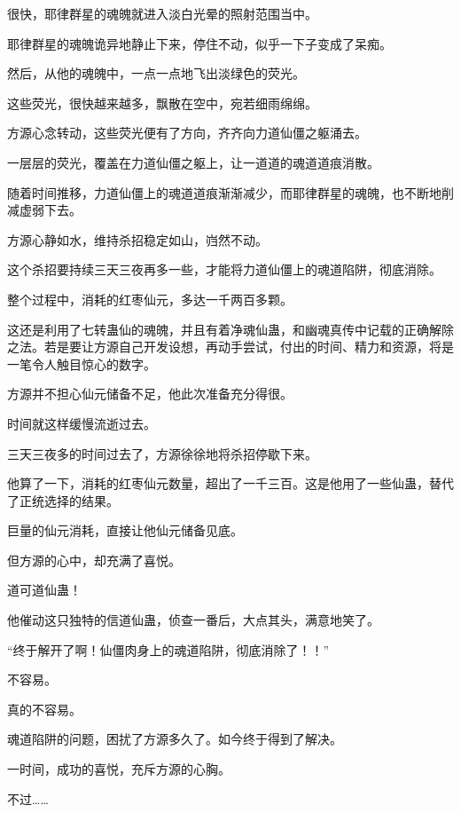 
\begin{this_body}



很快，耶律群星的魂魄就进入淡白光晕的照射范围当中。

耶律群星的魂魄诡异地静止下来，停住不动，似乎一下子变成了呆痴。

然后，从他的魂魄中，一点一点地飞出淡绿色的荧光。

这些荧光，很快越来越多，飘散在空中，宛若细雨绵绵。

方源心念转动，这些荧光便有了方向，齐齐向力道仙僵之躯涌去。

一层层的荧光，覆盖在力道仙僵之躯上，让一道道的魂道道痕消散。

随着时间推移，力道仙僵上的魂道道痕渐渐减少，而耶律群星的魂魄，也不断地削减虚弱下去。

方源心静如水，维持杀招稳定如山，岿然不动。

这个杀招要持续三天三夜再多一些，才能将力道仙僵上的魂道陷阱，彻底消除。

整个过程中，消耗的红枣仙元，多达一千两百多颗。

这还是利用了七转蛊仙的魂魄，并且有着净魂仙蛊，和幽魂真传中记载的正确解除之法。若是要让方源自己开发设想，再动手尝试，付出的时间、精力和资源，将是一笔令人触目惊心的数字。

方源并不担心仙元储备不足，他此次准备充分得很。

时间就这样缓慢流逝过去。

三天三夜多的时间过去了，方源徐徐地将杀招停歇下来。

他算了一下，消耗的红枣仙元数量，超出了一千三百。这是他用了一些仙蛊，替代了正统选择的结果。

巨量的仙元消耗，直接让他仙元储备见底。

但方源的心中，却充满了喜悦。

道可道仙蛊！

他催动这只独特的信道仙蛊，侦查一番后，大点其头，满意地笑了。

“终于解开了啊！仙僵肉身上的魂道陷阱，彻底消除了！！”

不容易。

真的不容易。

魂道陷阱的问题，困扰了方源多久了。如今终于得到了解决。

一时间，成功的喜悦，充斥方源的心胸。

不过……


\end{this_body}
